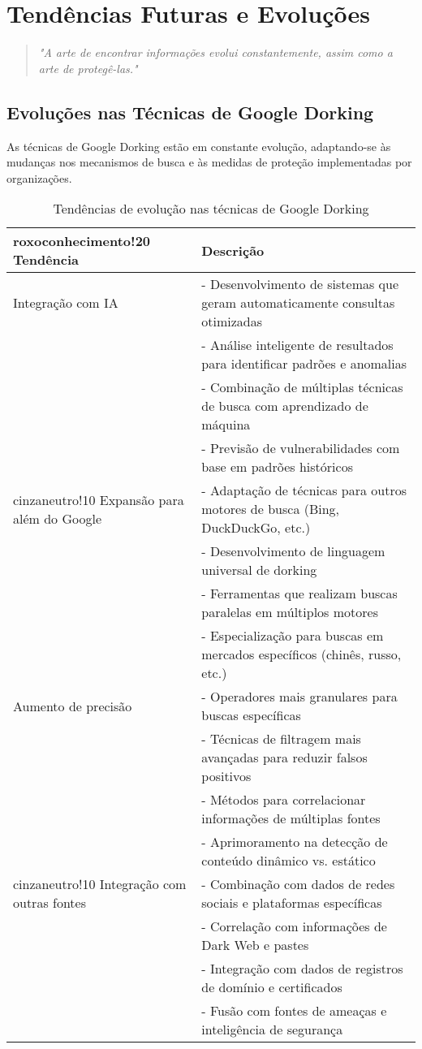 \documentclass[12pt,a4paper]{book}
\begin{document}
\chapter{Tendências Futuras e Evoluções}

\begin{quote}
\textit{"A arte de encontrar informações evolui constantemente, assim como a arte de protegê-las."} \\
\end{quote}

\section{Evoluções nas Técnicas de Google Dorking}

As técnicas de Google Dorking estão em constante evolução, adaptando-se às mudanças nos mecanismos de busca e às medidas de proteção implementadas por organizações.

\begin{table}[h]
\centering
\begin{tabular}{|p{4cm}|p{11cm}|}
\hline
{roxoconhecimento!20} \textbf{Tendência} & \textbf{Descrição} \\
\hline
Integração com IA & - Desenvolvimento de sistemas que geram automaticamente consultas otimizadas \\
& - Análise inteligente de resultados para identificar padrões e anomalias \\
& - Combinação de múltiplas técnicas de busca com aprendizado de máquina \\
& - Previsão de vulnerabilidades com base em padrões históricos \\
\hline
{cinzaneutro!10} Expansão para além do Google & - Adaptação de técnicas para outros motores de busca (Bing, DuckDuckGo, etc.) \\
& - Desenvolvimento de linguagem universal de dorking \\
& - Ferramentas que realizam buscas paralelas em múltiplos motores \\
& - Especialização para buscas em mercados específicos (chinês, russo, etc.) \\
\hline
Aumento de precisão & - Operadores mais granulares para buscas específicas \\
& - Técnicas de filtragem mais avançadas para reduzir falsos positivos \\
& - Métodos para correlacionar informações de múltiplas fontes \\
& - Aprimoramento na detecção de conteúdo dinâmico vs. estático \\
\hline
{cinzaneutro!10} Integração com outras fontes & - Combinação com dados de redes sociais e plataformas específicas \\
& - Correlação com informações de Dark Web e pastes \\
& - Integração com dados de registros de domínio e certificados \\
& - Fusão com fontes de ameaças e inteligência de segurança \\
\hline
\end{tabular}
\caption{Tendências de evolução nas técnicas de Google Dorking}
\end{table}
\end{document}
